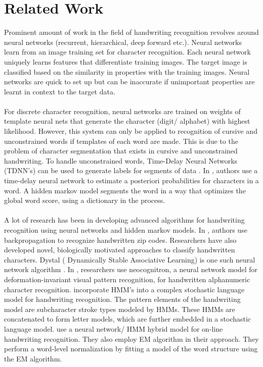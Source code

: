 \documentclass[oribibl]{llncs}
\begin{document}
\section{Related Work}
 
Prominent amount of work in the field of handwriting recognition revolves around neural networks (recurrent, hierarchical, deep forward etc.). Neural networks learn from an image training set for character recognition. Each neural network uniquely learns features that differentiate training images. The target image is classified based on the similarity in properties with the training images. Neural networks are quick to set up but can be inaccurate if unimportant properties are learnt in context to the target data. 
\\
\\
For discrete character recognition, neural networks are trained on weights of template neural nets that generate the character (digit/ alphabet) with highest likelihood. However, this system can only be applied to recognition of cursive and unconstrained words if templates of each word are made. This is due to the problem of character segmentation that exists in cursive and unconstrained handwriting. To handle unconstrained words, Time-Delay Neural Networks (TDNN's) can be used to generate labels for segments of data \cite{mantas1986overview}. In \cite{tddnn}, authors use a time-delay neural network to estimate a posteriori probabilities for characters in a word. A hidden markov model segments the word in a way that optimizes the global word score, using a dictionary in the process.
\\
\\
A lot of research has been in developing advanced algorithms for handwriting recognition using neural networks and hidden markov models. In \cite{LeCun:1989:BAH:1351079.1351090}, authors use backpropagation to recognize handwritten zip codes. Researchers have also developed novel, biologically motivated approaches to classify handwritten characters. Dystal ( Dynamically Stable Associative Learning) is one such neural network algorithm \cite{Blackwell1992655}. In \cite{97912}, researchers use neocognitron, a neural network model for deformation-invariant visual pattern recognition, for handwritten alphanumeric character recognition. \cite{541414} incorporate HMM's into a complex stochastic language model for handwriting recognition. The pattern elements of the handwriting model are subcharacter stroke types modeled by HMMs. These HMMs are concatenated to form letter models, which are further embedded in a stochastic language model. \cite{Bengio95lerec:a} use a neural network/ HMM hybrid model for on-line handwriting recognition. They also employ EM algorithm in their approach. They perform a word-level normalization by fitting a model of the word structure using the EM algorithm. 
\end{document}
